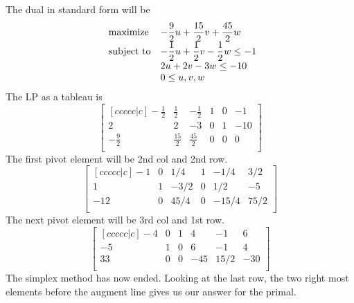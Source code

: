 \documentclass[12pt]{article}
\newenvironment{exercise}[2][Exercise]{\begin{trivlist}
		\item[\hskip \labelsep {\bfseries #1}\hskip \labelsep {\bfseries #2.}]}{\end{trivlist}}
\begin{document}
\begin{exercise}{3}
		The dual in standard form will be 
		\begin{equation*}
			\begin{array}{ll@{}ll}
				\text{maximize}  & \displaystyle -\frac{9}{2}u+\frac{15}{2}v+\frac{45}{2}w \\
				\text{subject to}& \displaystyle -\frac{1}{2}u+\frac{1}{2}v-\frac{1}{2}w \leq -1 \\
				& \displaystyle 2u + 2v - 3w \leq -10 \\
				& \displaystyle 0 \leq u,v,w \\
			\end{array}
		\end{equation*}
		The LP as a tableau is\\
		\[\begin{bmatrix}[ccccc|c]
			-\frac{1}{2} & \frac{1}{2} & -\frac{1}{2} & 1 & 0 & -1 \\
			2  & 2 & -3 & 0 & 1 & -10  \\
			-\frac{9}{2} & \frac{15}{2} & \frac{45}{2} & 0 & 0 & 0  \\
		\end{bmatrix}\]
		The first pivot element will be 2nd col and 2nd row.
		\[\begin{bmatrix}[ccccc|c]
			-1 & 0 & 1/4 & 1 & -1/4 & 3/2 \\
			1 & 1 & -3/2 & 0 & 1/2 & -5  \\
			-12 & 0 & 45/4 & 0 & -15/4 & 75/2  \\
		\end{bmatrix}\]
		The next pivot element will be 3rd col and 1st row.
		\[\begin{bmatrix}[ccccc|c]
			-4 & 0 & 1 & 4 & -1 & 6 \\
			-5 & 1 & 0 & 6 & -1 & 4  \\
			33 & 0 & 0 & -45 & 15/2 & -30  \\
		\end{bmatrix}\]
		The simplex method has now ended. Looking at the last row, the two right most elements before the augment line gives us our answer for the primal.
	\end{exercise}
	
\end{document}
